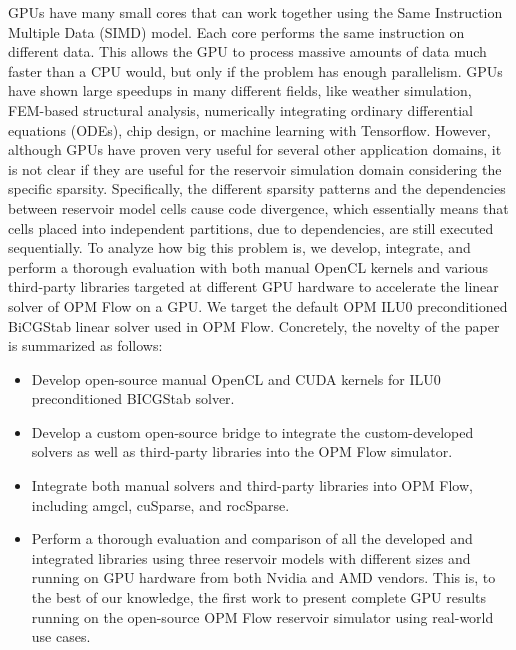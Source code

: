 GPUs have many small cores that can work together using the Same Instruction Multiple Data (SIMD) model. Each core performs the same instruction on different data. This allows the GPU to process massive amounts of data much faster than a CPU would, but only if the problem has enough parallelism. GPUs have shown large speedups in many different fields, like weather simulation\cite{gpu_weather}, FEM-based structural analysis\cite{gpu_struct}, numerically integrating ordinary differential equations (ODEs)\cite{gpu_ode}, chip design\cite{gpu_chip}, or machine learning with Tensorflow\cite{gpu_tensorflow}. However, although GPUs have proven very useful for several other application domains, it is not clear if they are useful for the reservoir simulation domain considering the specific sparsity. Specifically, the different sparsity patterns and the dependencies between reservoir model cells cause code divergence, which essentially means that cells placed into independent partitions, due to dependencies, are still executed sequentially. To analyze how big this problem is, we develop, integrate, and perform a thorough evaluation with both manual OpenCL kernels and various third-party libraries targeted at different GPU hardware to accelerate the linear solver of OPM Flow\cite{flow_paper} on a GPU. We target the default OPM ILU0 preconditioned BiCGStab linear solver used in OPM Flow. Concretely, the novelty of the paper is summarized as follows:

\begin{itemize}
    \item Develop open-source manual OpenCL and CUDA kernels for ILU0 preconditioned BICGStab solver.
    \item Develop a custom open-source bridge to integrate the custom-developed solvers as well as third-party libraries into the OPM Flow simulator. 
    \item Integrate both manual solvers and third-party libraries into OPM Flow, including amgcl, cuSparse, and rocSparse.
    \item Perform a thorough evaluation and comparison of all the developed and integrated libraries using three reservoir models with different sizes and running on GPU hardware from both Nvidia and AMD vendors. This is, to the best of our knowledge, the first work to present complete GPU results running on the open-source OPM Flow reservoir simulator using real-world use cases. 
\end{itemize}

